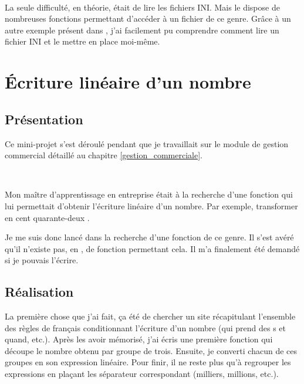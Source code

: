 ~

La seule difficulté, en théorie, était de lire les fichiers INI. Mais le \vb{} dispose de nombreuses fonctions permettant d'accéder à un fichier de ce genre. Grâce à un autre exemple présent dans \integrale, j'ai facilement pu comprendre comment lire un fichier INI et le mettre en place moi-même.

\section{Écriture linéaire d'un nombre}
\subsection{Présentation}
Ce mini-projet s'est déroulé pendant que je travaillait sur le module de gestion commercial détaillé au chapitre \ref{gestion_commerciale}.

~

Mon maître d'apprentissage en entreprise était à la recherche d'une fonction qui lui permettait d'obtenir l'écriture linéaire d'un nombre. Par exemple, transformer  \fg{} en \og cent quarante-deux \fg.

Je me suis donc lancé dans la recherche d'une fonction de ce genre. Il s'est avéré qu'il n'existe pas, en \vb, de fonction permettant cela. Il m'a finalement été demandé si je pouvais l'écrire.

\subsection{Réalisation}
La première chose que j'ai fait, ça été de chercher un site récapitulant l'ensemble des règles de français conditionnant l'écriture d'un nombre (qui prend des \og s \fg{} et quand, etc.). Après les avoir mémorisé, j'ai écris une première fonction qui découpe le nombre obtenu par groupe de trois. Ensuite, je converti chacun de ces groupes en son expression linéaire. Pour finir, il ne reste plus qu'à regrouper les expressions en plaçant les séparateur correspondant (milliers, millions, etc.).
